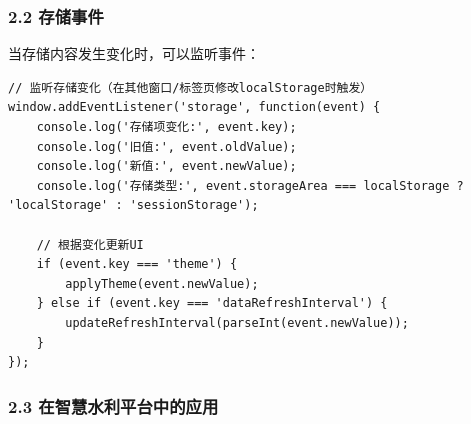 \subsubsection{2.2 存储事件}\label{ux5b58ux50a8ux4e8bux4ef6}

当存储内容发生变化时，可以监听事件：

\begin{lstlisting}
// 监听存储变化（在其他窗口/标签页修改localStorage时触发）
window.addEventListener('storage', function(event) {
    console.log('存储项变化:', event.key);
    console.log('旧值:', event.oldValue);
    console.log('新值:', event.newValue);
    console.log('存储类型:', event.storageArea === localStorage ? 'localStorage' : 'sessionStorage');
    
    // 根据变化更新UI
    if (event.key === 'theme') {
        applyTheme(event.newValue);
    } else if (event.key === 'dataRefreshInterval') {
        updateRefreshInterval(parseInt(event.newValue));
    }
});
\end{lstlisting}

\subsubsection{2.3
在智慧水利平台中的应用}\label{ux5728ux667aux6167ux6c34ux5229ux5e73ux53f0ux4e2dux7684ux5e94ux7528-1}

